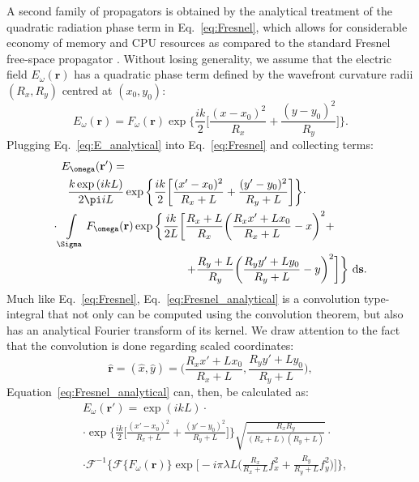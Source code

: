 \documentclass{iucr}              %
\begin{document}
A second family of propagators is obtained by the analytical treatment of the quadratic radiation phase term in Eq.~\ref{eq:Fresnel}, which allows for considerable economy of memory and CPU resources as compared to
the standard Fresnel free-space propagator \cite{ChubarCelestre}. Without losing generality, we assume that the electric field $E_\omega(\textbf{r})$ has a quadratic phase term defined by the wavefront curvature radii $(R_x, R_y)$ centred at $(x_0,y_0)$:
 \begin{equation}\label{eq:E_analytical}
    E_\omega(\textbf{r}) = F_\omega(\textbf{r})\exp\bigg\{ \frac{ik}{2}\bigg[ \frac{(x-x_0)^2}{R_x} + \frac{(y-y_0)^2}{R_y} \bigg]\bigg\}.
\end{equation}
Plugging Eq.~\ref{eq:E_analytical} into Eq.~\ref{eq:Fresnel} and collecting terms:
\begin{equation}\label{eq:Fresnel_analytical}
\begin{split}
    E_\omega(\textbf{r}') = \qquad\qquad\qquad\qquad\qquad\qquad\qquad\qquad\qquad\quad &\\
    \frac{k\exp{(ikL)}}{2\pi i L}\exp\bigg\{ \frac{ik}{2}\bigg[ \frac{(x'-x_0)^2}{R_x+L} + \frac{(y'-y_0)^2}{R_y+L} \bigg] \bigg\}\cdot \qquad\quad &\\
    \cdot\int\limits_{\Sigma}{F_\omega(\textbf{r})\exp{\bigg\{ \frac{ik}{2L}\bigg[ \frac{R_x+L}{R_x}\bigg(\frac{R_xx'+Lx_0}{R_x+L}-x\bigg)^2+}} \enspace\\
    \hfill+ \frac{R_y+L}{R_y}\bigg(\frac{R_yy'+Ly_0}{R_y+L}-y\bigg)^2\bigg] & \bigg\}~\mathrm{d}\textbf{s}.
\end{split}
\end{equation}
Much like Eq.~\ref{eq:Fresnel}, Eq.~\ref{eq:Fresnel_analytical} is a convolution type-integral that not only can be computed using the convolution theorem, but also has an analytical Fourier transform of its kernel. We draw attention to the fact that the convolution is done regarding scaled coordinates:
\begin{equation}\label{eq:coordinates}
\hat{\textbf{r}}=(\hat{x},\hat{y})=\bigg(\frac{R_xx'+Lx_0}{R_x+L}, \frac{R_yy'+Ly_0}{R_y+L}\bigg),
\end{equation}
Equation~\ref{eq:Fresnel_analytical} can, then, be calculated as:
\begin{equation}\label{eq:Fresnel_analyticalConv}
\begin{split}
&E_\omega(\textbf{r}') =\exp{(ikL)}\cdot\\
&\cdot\exp\bigg\{ \frac{ik}{2}\bigg[ \frac{(x'-x_0)^2}{R_x+L} + \frac{(y'-y_0)^2}{R_y+L} \bigg] \bigg\}\sqrt{\frac{R_xR_y}{(R_x+L)(R_y+L)}}\cdot\\
&\cdot\mathcal{F}^{-1}\bigg\{\mathcal{F}\{F_\omega(\textbf{r})\}\exp\bigg[-i\pi\lambda L\bigg(\frac{R_x}{R_x+L}f_x^2 +\frac{R_y}{R_y+L}f_y^2\bigg)\bigg]\bigg\},
\end{split}
\end{equation}
\end{document}
